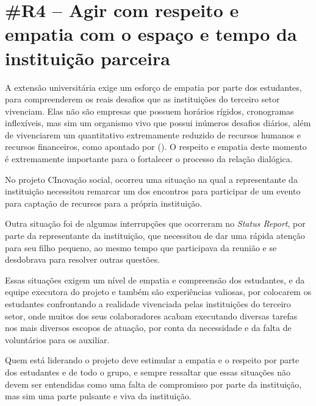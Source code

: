 \section*{\#R4 – Agir com respeito e empatia com o espaço e tempo da instituição parceira}

A extensão universitária exige um esforço de empatia por parte dos estudantes, para compreenderem os reais desafios que as instituições do terceiro setor vivenciam. Elas não são empresas que possuem horários rígidos, cronogramas inflexíveis, mas sim um organismo vivo que possui inúmeros desafios diários, além de vivenciarem um quantitativo extremamente reduzido de recursos humanos e recursos financeiros, como apontado por \citeauthor{gama2023} (\citeyear{gama2023}). O respeito e empatia deste momento é extremamente importante para o fortalecer o processo da relação dialógica.

No projeto CInovação social, ocorreu uma situação na qual a representante da instituição necessitou remarcar um dos encontros para participar de um evento para captação de recursos para a própria instituição. 

Outra situação foi de algumas interrupções que ocorreram no \textit{Status Report}, por parte da representante da instituição, que necessitou de dar uma rápida atenção para seu filho pequeno, ao mesmo tempo que participava da reunião e se desdobrava para resolver outras questões. 

Essas situações exigem um nível de empatia e compreensão dos estudantes, e da equipe executora do projeto e também são experiências valiosas, por colocarem os estudantes confrontando a realidade vivenciada pelas instituições do terceiro setor, onde muitos dos seus colaboradores acabam executando diversas tarefas nos mais diversos escopos de atuação, por conta da necessidade e da falta de voluntários para os auxiliar.

Quem está liderando o projeto deve estimular a empatia e o respeito por parte dos estudantes e de todo o grupo, e sempre ressaltar que essas situações não devem ser entendidas como uma falta de compromisso por parte da instituição, mas sim uma parte pulsante e viva da instituição.
